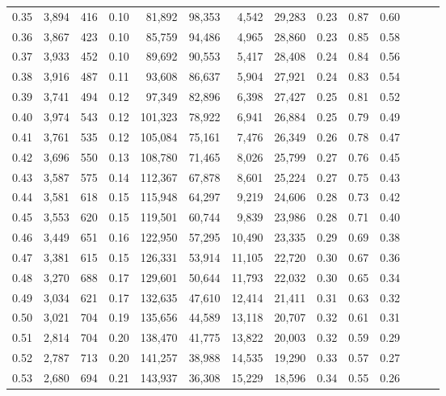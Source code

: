 \begin{tabular}{rrrrrrrrrrrrrr}
0.35 &  3,894 &  416 &  0.10 &   81,892 &   98,353 &   4,542 &  29,283 &  0.23 &  0.87 &      0.60 \\
0.36 &  3,867 &  423 &  0.10 &   85,759 &   94,486 &   4,965 &  28,860 &  0.23 &  0.85 &      0.58 \\
0.37 &  3,933 &  452 &  0.10 &   89,692 &   90,553 &   5,417 &  28,408 &  0.24 &  0.84 &      0.56 \\
0.38 &  3,916 &  487 &  0.11 &   93,608 &   86,637 &   5,904 &  27,921 &  0.24 &  0.83 &      0.54 \\
0.39 &  3,741 &  494 &  0.12 &   97,349 &   82,896 &   6,398 &  27,427 &  0.25 &  0.81 &      0.52 \\
0.40 &  3,974 &  543 &  0.12 &  101,323 &   78,922 &   6,941 &  26,884 &  0.25 &  0.79 &      0.49 \\
0.41 &  3,761 &  535 &  0.12 &  105,084 &   75,161 &   7,476 &  26,349 &  0.26 &  0.78 &      0.47 \\
0.42 &  3,696 &  550 &  0.13 &  108,780 &   71,465 &   8,026 &  25,799 &  0.27 &  0.76 &      0.45 \\
0.43 &  3,587 &  575 &  0.14 &  112,367 &   67,878 &   8,601 &  25,224 &  0.27 &  0.75 &      0.43 \\
0.44 &  3,581 &  618 &  0.15 &  115,948 &   64,297 &   9,219 &  24,606 &  0.28 &  0.73 &      0.42 \\
0.45 &  3,553 &  620 &  0.15 &  119,501 &   60,744 &   9,839 &  23,986 &  0.28 &  0.71 &      0.40 \\
0.46 &  3,449 &  651 &  0.16 &  122,950 &   57,295 &  10,490 &  23,335 &  0.29 &  0.69 &      0.38 \\
0.47 &  3,381 &  615 &  0.15 &  126,331 &   53,914 &  11,105 &  22,720 &  0.30 &  0.67 &      0.36 \\
0.48 &  3,270 &  688 &  0.17 &  129,601 &   50,644 &  11,793 &  22,032 &  0.30 &  0.65 &      0.34 \\
0.49 &  3,034 &  621 &  0.17 &  132,635 &   47,610 &  12,414 &  21,411 &  0.31 &  0.63 &      0.32 \\
0.50 &  3,021 &  704 &  0.19 &  135,656 &   44,589 &  13,118 &  20,707 &  0.32 &  0.61 &      0.31 \\
0.51 &  2,814 &  704 &  0.20 &  138,470 &   41,775 &  13,822 &  20,003 &  0.32 &  0.59 &      0.29 \\
0.52 &  2,787 &  713 &  0.20 &  141,257 &   38,988 &  14,535 &  19,290 &  0.33 &  0.57 &      0.27 \\
0.53 &  2,680 &  694 &  0.21 &  143,937 &   36,308 &  15,229 &  18,596 &  0.34 &  0.55 &      0.26 \\

\end{tabular}
